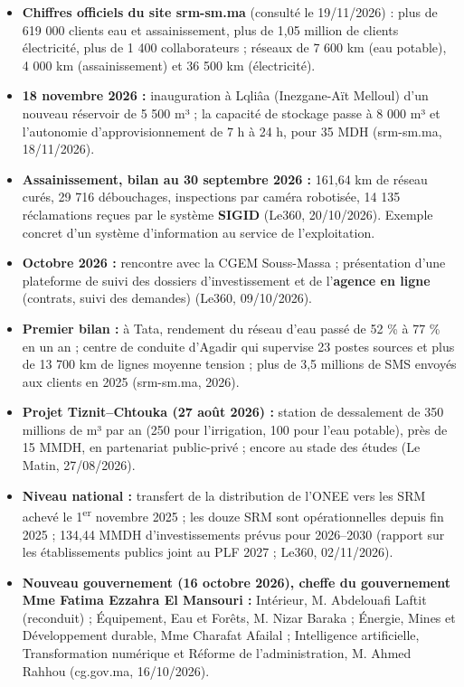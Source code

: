 \begin{tcolorbox}[colback=green!4!white,colframe=green!40!black,title=\textbf{Nouveautés au 19 novembre 2026 (vérifiées sur sources datées)}]
\begin{itemize}
    \item \textbf{Chiffres officiels du site srm-sm.ma} (consulté le 19/11/2026) : plus de 619 000 clients eau et assainissement, plus de 1,05 million de clients électricité, plus de 1 400 collaborateurs ; réseaux de 7 600 km (eau potable), 4 000 km (assainissement) et 36 500 km (électricité).
    \item \textbf{18 novembre 2026 :} inauguration à Lqliâa (Inezgane-Aït Melloul) d'un nouveau réservoir de 5 500 m³ ; la capacité de stockage passe à 8 000 m³ et l'autonomie d'approvisionnement de 7 h à 24 h, pour 35 MDH (srm-sm.ma, 18/11/2026).
    \item \textbf{Assainissement, bilan au 30 septembre 2026 :} 161,64 km de réseau curés, 29 716 débouchages, inspections par caméra robotisée, 14 135 réclamations reçues par le système \textbf{SIGID} (Le360, 20/10/2026). Exemple concret d'un système d'information au service de l'exploitation.
    \item \textbf{Octobre 2026 :} rencontre avec la CGEM Souss-Massa ; présentation d'une plateforme de suivi des dossiers d'investissement et de l'\textbf{agence en ligne} (contrats, suivi des demandes) (Le360, 09/10/2026).
    \item \textbf{Premier bilan :} à Tata, rendement du réseau d'eau passé de 52 \% à 77 \% en un an ; centre de conduite d'Agadir qui supervise 23 postes sources et plus de 13 700 km de lignes moyenne tension ; plus de 3,5 millions de SMS envoyés aux clients en 2025 (srm-sm.ma, 2026).
    \item \textbf{Projet Tiznit--Chtouka (27 août 2026) :} station de dessalement de 350 millions de m³ par an (250 pour l'irrigation, 100 pour l'eau potable), près de 15 MMDH, en partenariat public-privé ; encore au stade des études (Le Matin, 27/08/2026).
    \item \textbf{Niveau national :} transfert de la distribution de l'ONEE vers les SRM achevé le 1\textsuperscript{er} novembre 2025 ; les douze SRM sont opérationnelles depuis fin 2025 ; 134,44 MMDH d'investissements prévus pour 2026--2030 (rapport sur les établissements publics joint au PLF 2027 ; Le360, 02/11/2026).
    \item \textbf{Nouveau gouvernement (16 octobre 2026), cheffe du gouvernement Mme Fatima Ezzahra El Mansouri :} Intérieur, M. Abdelouafi Laftit (reconduit) ; Équipement, Eau et Forêts, M. Nizar Baraka ; Énergie, Mines et Développement durable, Mme Charafat Afailal ; Intelligence artificielle, Transformation numérique et Réforme de l'administration, M. Ahmed Rahhou (cg.gov.ma, 16/10/2026).
\end{itemize}
\end{tcolorbox}

